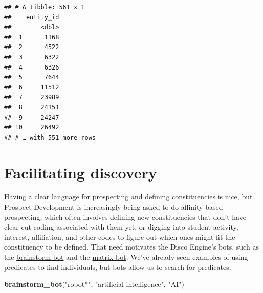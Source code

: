 \documentclass[]{book}
\newenvironment{Shaded}{\begin{snugshade}}{\end{snugshade}}
\newcommand{\KeywordTok}[1]{\textcolor[rgb]{0.13,0.29,0.53}{\textbf{#1}}}
\newcommand{\NormalTok}[1]{#1}
\newcommand{\StringTok}[1]{\textcolor[rgb]{0.31,0.60,0.02}{#1}}
\begin{document}
\begin{verbatim}
## # A tibble: 561 x 1
##    entity_id
##        <dbl>
##  1      1168
##  2      4522
##  3      6322
##  4      6326
##  5      7644
##  6     11512
##  7     23989
##  8     24151
##  9     24247
## 10     26492
## # … with 551 more rows
\end{verbatim}

\hypertarget{facilitating-discovery}{%
\section{Facilitating discovery}\label{facilitating-discovery}}

Having a clear language for prospecting and defining constituencies is nice, but Prospect Development is increasingly being asked to do affinity-based prospecting, which often involves defining new constituencies that don't have clear-cut coding associated with them yet, or digging into student activity, interest, affiliation, and other codes to figure out which ones might fit the constituency to be defined. That need motivates the Disco Engine's bots, such as the \protect\hyperlink{brainstorm-bot}{brainstorm bot} and the \protect\hyperlink{matrix-bot}{matrix bot}. We've already seen examples of using predicates to find individuals, but bots allow us to search for predicates.

\begin{Shaded}
\begin{Highlighting}[]
\KeywordTok{brainstorm_bot}\NormalTok{(}\StringTok{"robot*"}\NormalTok{, }\StringTok{"artificial intelligence"}\NormalTok{, }\StringTok{"AI"}\NormalTok{)}
\end{Highlighting}
\end{Shaded}
\end{document}
